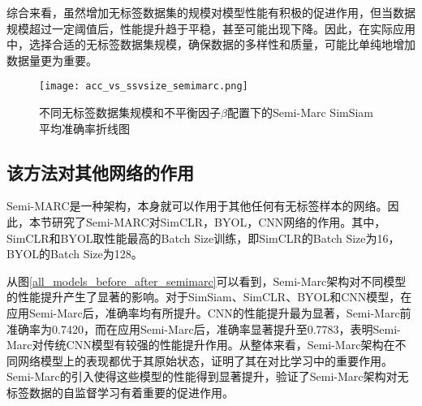 \documentclass[master]{thesis-uestc}
\begin{document}
综合来看，虽然增加无标签数据集的规模对模型性能有积极的促进作用，但当数据规模超过一定阈值后，性能提升趋于平稳，甚至可能出现下降。因此，在实际应用中，选择合适的无标签数据集规模，确保数据的多样性和质量，可能比单纯地增加数据量更为重要。

\begin{figure}[h]
    \centering
    \texttt{[image: acc\_vs\_ssvsize\_semimarc.png]}
    \caption{不同无标签数据集规模和不平衡因子$\beta$配置下的Semi-Marc SimSiam平均准确率折线图}
    \label{acc_vs_ssvsize_semimarc}
\end{figure}

\subsection{该方法对其他网络的作用}
Semi-MARC是一种架构，本身就可以作用于其他任何有无标签样本的网络。因此，本节研究了Semi-MARC对SimCLR，BYOL，CNN网络的作用。其中，SimCLR和BYOL取性能最高的Batch Size训练，即SimCLR的Batch Size为16，BYOL的Batch Size为128。

从图\ref{all_models_before_after_semimarc}可以看到，Semi-Marc架构对不同模型的性能提升产生了显著的影响。对于SimSiam、SimCLR、BYOL和CNN模型，在应用Semi-Marc后，准确率均有所提升。CNN的性能提升最为显著，Semi-Marc前准确率为0.7420，而在应用Semi-Marc后，准确率显著提升至0.7783，表明Semi-Marc对传统CNN模型有较强的性能提升作用。从整体来看，Semi-Marc架构在不同网络模型上的表现都优于其原始状态，证明了其在对比学习中的重要作用。Semi-Marc的引入使得这些模型的性能得到显著提升，验证了Semi-Marc架构对无标签数据的自监督学习有着重要的促进作用。
\end{document}
